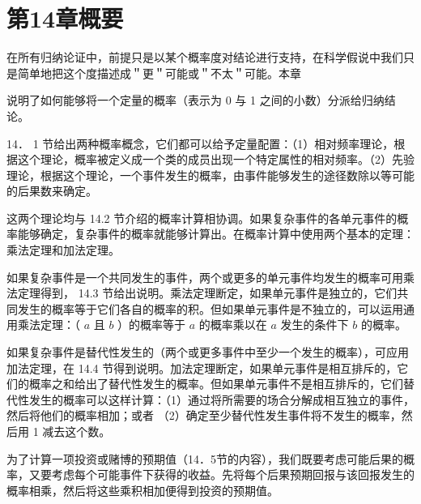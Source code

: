 \section*{第14章概要}
在所有归纳论证中，前提只是以某个概率度对结论进行支持，在科学假说中我们只是简单地把这个度描述成＂更＂可能或＂不太＂可能。本章

说明了如何能够将一个定量的概率（表示为 0 与 1 之间的小数）分派给归纳结论。

14． 1 节给出两种概率概念，它们都可以给予定量配置：（1）相对频率理论，根据这个理论，概率被定义成一个类的成员出现一个特定属性的相对频率。（2）先验理论，根据这个理论，一个事件发生的概率，由事件能够发生的途径数除以等可能的后果数来确定。

这两个理论均与 14.2 节介绍的概率计算相协调。如果复杂事件的各单元事件的概率能够确定，复杂事件的概率就能够计算出。在概率计算中使用两个基本的定理：乘法定理和加法定理。

如果复杂事件是一个共同发生的事件，两个或更多的单元事件均发生的概率可用乘法定理得到， 14.3 节给出说明。乘法定理断定，如果单元事件是独立的，它们共同发生的概率等于它们各自的概率的积。但如果单元事件是不独立的，可以运用通用乘法定理：（ $a$ 且 $b$ ）的概率等于 $a$ 的概率乘以在 $a$ 发生的条件下 $b$ 的概率。

如果复杂事件是替代性发生的（两个或更多事件中至少一个发生的概率），可应用加法定理，在 14.4 节得到说明。加法定理断定，如果单元事件是相互排斥的，它们的概率之和给出了替代性发生的概率。但如果单元事件不是相互排斥的，它们替代性发生的概率可以这样计算：（1）通过将所需要的场合分解成相互独立的事件，然后将他们的概率相加；或者 （2）确定至少替代性发生事件将不发生的概率，然后用 1 减去这个数。

为了计算一项投资或赌博的预期值（14．5节的内容），我们既要考虑可能后果的概率，又要考虑每个可能事件下获得的收益。先将每个后果预期回报与该回报发生的概率相乘，然后将这些乘积相加便得到投资的预期值。 